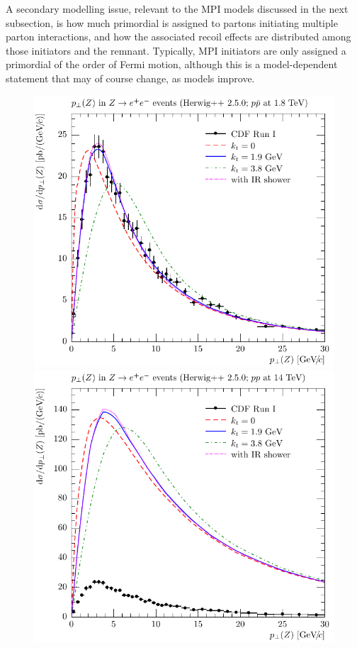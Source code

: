 A secondary modelling issue, relevant to the MPI models discussed in
the next subsection, is how much primordial \kT is assigned to
partons initiating multiple parton interactions, and 
how the associated recoil effects are distributed
among those initiators and the remnant. Typically, MPI initiators are
only assigned a primordial \kT of the order of Fermi motion, 
although this is a model-dependent statement that
may of course change, as models improve.

\begin{figure}[tp]
  \centering
    \label{fig:inline:drell-yan-intrinsic-kt-tvt}
    \includegraphics*[scale=0.55]{mc-plots/CDF_2000_S4155203-inline/CDF_2000_S4155203_d01-x01-y01}
    \includegraphics*[scale=0.55]{mc-plots/CDF_2000_S4155203-inline/CDF_2000_S4155203_MOD_d01-x01-y01}

\end{figure}

